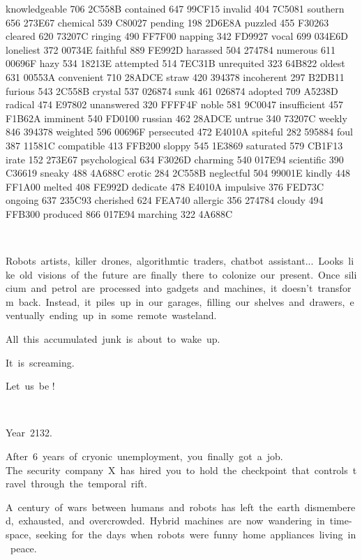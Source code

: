 knowledgeable 706 2C558B contained 647 99CF15 invalid 404 7C5081
southern 656 273E67 chemical 539 C80027 pending 198 2D6E8A puzzled 455
F30263 cleared 620 73207C ringing 490 FF7F00 napping 342 FD9927 vocal
699 034E6D loneliest 372 00734E faithful 889 FE992D harassed 504 274784
numerous 611 00696F hazy 534 18213E attempted 514 7EC31B unrequited 323
64B822 oldest 631 00553A convenient 710 28ADCE straw 420 394378
incoherent 297 B2DB11 furious 543 2C558B crystal 537 026874 sunk 461
026874 adopted 709 A5238D radical 474 E97802 unanswered 320 FFFF4F
noble 581 9C0047 insufficient 457 F1B62A imminent 540 FD0100 russian
462 28ADCE untrue 340 73207C weekly 846 394378 weighted 596 00696F
persecuted 472 E4010A spiteful 282 595884 foul 387 11581C compatible
413 FFB200 sloppy 545 1E3869 saturated 579 CB1F13 irate 152 273E67
psychological 634 F3026D charming 540 017E94 scientific 390 C36619
sneaky 488 4A688C erotic 284 2C558B neglectful 504 99001E kindly 448
FF1A00 melted 408 FE992D dedicate 478 E4010A impulsive 376 FED73C
ongoing 637 235C93 cherished 624 FEA740 allergic 356 274784 cloudy 494
FFB300 produced 866 017E94 marching 322 4A688C


~

Robots~artists,~killer~drones,~algorithmtic~traders,~chatbot~assistant...~Looks~like~old~visions~of~the~future~are~finally~there~to~colonize~our~present.~Once~silicium~and~petrol~are~processed~into~gadgets~and~machines,~it~doesn{\textquoteright}t~transform~back.~Instead,~it~piles~up~in~our~garages,~filling~our~shelves~and~drawers,~eventually~ending~up~in~some~remote~wasteland.

All~this~accumulated~junk~is~about~to~wake~up.~

It~is~screaming.~

Let~us~be !

~


Year~2132.

After~6~years~of~cryonic~unemployment,~you~finally~got~a~job.\newline
The~security~company~X~has~hired~you~to~hold~the~checkpoint~that~controls~travel~through~the~temporal~rift.

A~century~of~wars~between~humans~and~robots~has~left~the~earth~dismembered,~exhausted,~and~overcrowded.~Hybrid~machines~are~now~wandering~in~time-space,~seeking~for~the~days~when~robots~were~funny~home~appliances~living~in~peace.

